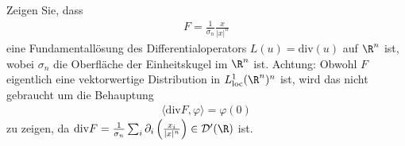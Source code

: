 
\begin{exercise}

Zeigen Sie, dass
\begin{align*}
  F = \frac{1}{\sigma_n}\frac{x}{|x|^n}
\end{align*}
eine Fundamentallösung des Differentialoperators $L(u) = \mathrm{div}(u)$ auf $\R^n$ ist,
wobei $\sigma_n$ die Oberfläche der Einheitskugel im $\R^n$ ist. Achtung:
Obwohl $F$ eigentlich eine vektorwertige Distribution in $L_{\mathrm{loc}}^1(\R^n)^n$ ist,
wird das nicht gebraucht um die Behauptung
\begin{align*}
  \langle \mathrm{div} F, \varphi \rangle = \varphi(0)
\end{align*}
zu zeigen, da
$\mathrm{div} F = \frac{1}{\sigma_n}\sum_{i}\partial_i\left(\frac{x_i}{|x|^n}\right) \in \mathcal{D}^{\prime}(\R)$
ist.
\end{exercise}


